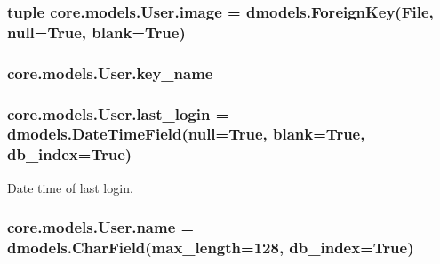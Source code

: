 \hypertarget{classcore_1_1models_1_1User_ad67e2fdbefe9f02c44070d697cf9faa1}{
\subsubsection[{image}]{\setlength{\rightskip}{0pt plus 5cm}tuple core.\-models.\-User.\-image = dmodels.\-Foreign\-Key({\bf File}, null=True, blank=True)\hspace{0.3cm}{\ttfamily [static]}}}\label{classcore_1_1models_1_1User_ad67e2fdbefe9f02c44070d697cf9faa1}
\hypertarget{classcore_1_1models_1_1User_a850844de5beed6acc7ce8548e56b40f6}{
\subsubsection[{key\-\_\-name}]{\setlength{\rightskip}{0pt plus 5cm}core.\-models.\-User.\-key\-\_\-name}}\label{classcore_1_1models_1_1User_a850844de5beed6acc7ce8548e56b40f6}
\hypertarget{classcore_1_1models_1_1User_a95cfe2aedf4dea7b41e0983035663e43}{
\subsubsection[{last\-\_\-login}]{\setlength{\rightskip}{0pt plus 5cm}core.\-models.\-User.\-last\-\_\-login = dmodels.\-Date\-Time\-Field(null=True, blank=True, db\-\_\-index=True)\hspace{0.3cm}{\ttfamily [static]}}}\label{classcore_1_1models_1_1User_a95cfe2aedf4dea7b41e0983035663e43}


Date time of last login. 

\hypertarget{classcore_1_1models_1_1User_a6e3378459abae4fc27fcd46d1cd24990}{
\subsubsection[{name}]{\setlength{\rightskip}{0pt plus 5cm}core.\-models.\-User.\-name = dmodels.\-Char\-Field(max\-\_\-length=128, db\-\_\-index=True)\hspace{0.3cm}{\ttfamily [static]}}}\label{classcore_1_1models_1_1User_a6e3378459abae4fc27fcd46d1cd24990}


